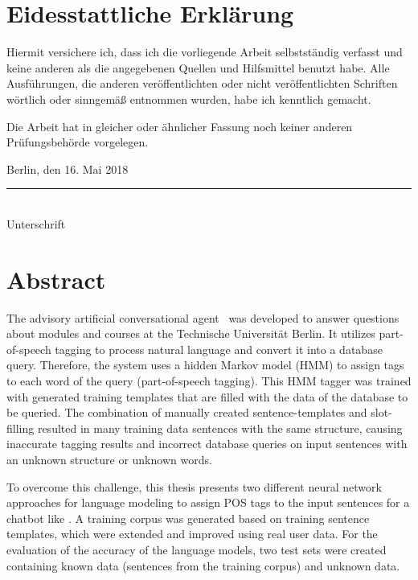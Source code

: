 \BlankPage

\chapter*{Eidesstattliche Erklärung}
Hiermit versichere ich, dass ich die vorliegende Arbeit selbstständig verfasst und keine anderen als die angegebenen Quellen und Hilfsmittel benutzt habe. Alle Ausführungen, die anderen veröffentlichten oder nicht veröffentlichten Schriften wörtlich oder sinngemäß entnommen wurden, habe ich kenntlich gemacht.

Die Arbeit hat in gleicher oder ähnlicher Fassung noch keiner anderen Prüfungsbehörde vorgelegen.
\vspace{10mm}

Berlin, den 16. Mai 2018\\

\vspace{1cm}
\rule{.5\textwidth}{.5pt}\\
Unterschrift

\BlankPage

\chapter*{Abstract}
The advisory artificial conversational agent \Alex\ was developed to answer questions about modules and courses at the Technische Universität Berlin. It utilizes part-of-speech tagging to process natural language and convert it into a database query. Therefore, the system uses a hidden Markov model (HMM) to assign tags to each word of the query (part-of-speech tagging). This HMM tagger was trained with generated training templates that are filled with the data of the database to be queried. The combination of manually created sentence-templates and slot-filling resulted in many training data sentences with the same structure, causing inaccurate tagging results and incorrect database queries on input sentences with an unknown structure or unknown words.

To overcome this challenge, this thesis presents two different neural network approaches for language modeling to assign POS tags to the input sentences for a chatbot like \Alex. A training corpus was generated based on training sentence templates, which were extended and improved using real user data. For the evaluation of the accuracy of the language models, two test sets were created containing known data (sentences from the training corpus) and unknown data.

